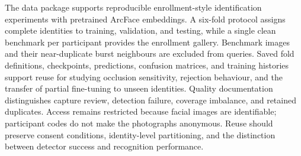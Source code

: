 \documentclass[11pt,a4paper]{article}
\newcommand{\nextpage}{\clearpage}
\begin{document}
The data package supports reproducible enrollment-style identification experiments with pretrained ArcFace embeddings. A six-fold protocol assigns complete identities to training, validation, and testing, while a single clean benchmark per participant provides the enrollment gallery. Benchmark images and their near-duplicate burst neighbours are excluded from queries. Saved fold definitions, checkpoints, predictions, confusion matrices, and training histories support reuse for studying occlusion sensitivity, rejection behaviour, and the transfer of partial fine-tuning to unseen identities. Quality documentation distinguishes capture review, detection failure, coverage imbalance, and retained duplicates. Access remains restricted because facial images are identifiable; participant codes do not make the photographs anonymous. Reuse should preserve consent conditions, identity-level partitioning, and the distinction between detector success and recognition performance.

\nextpage
\end{document}
